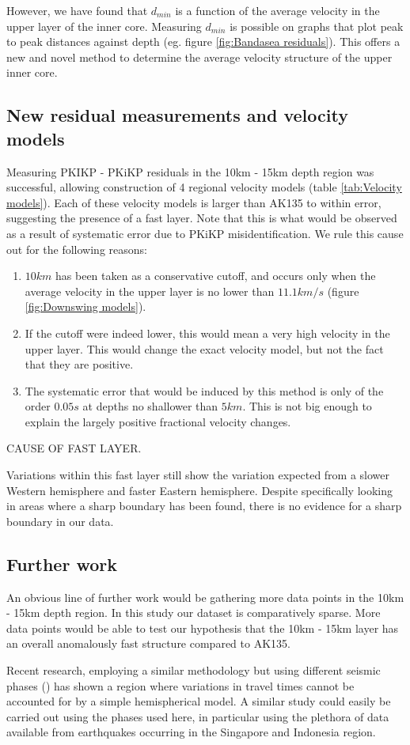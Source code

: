 \documentclass[11pt,a4paper]{article}
\begin{document}
However, we have found that $d_{min}$ is a function of the average velocity in the upper layer of the inner core. Measuring $d_{min}$ is possible on graphs that plot peak to peak distances against depth (eg. figure \ref{fig:Bandasea residuals}). This offers a new and novel method to determine the average velocity structure of the upper inner core.
\subsection{New residual measurements and velocity models}
Measuring PKIKP - PKiKP residuals in the 10km - 15km depth region was successful, allowing construction of 4 regional velocity models (table \ref{tab:Velocity models}). Each of these velocity models is larger than AK135 to within error, suggesting the presence of a fast layer. Note that this is what would be observed as a result of systematic error due to PKiKP misidentification. We rule this cause out for the following reasons:

\begin{enumerate}
	\item $10km$ has been taken as a conservative cutoff, and occurs only when the average velocity in the upper layer is no lower than $11.1 km/s$ (figure \ref{fig:Downswing models}).
	\item If the cutoff were indeed lower, this would mean a very high velocity in the upper layer. This would change the exact velocity model, but not the fact that they are positive.
	\item The systematic error that would be induced by this method is only of the order $0.05s$ at depths no shallower than $5km$. This is not big enough to explain the largely positive fractional velocity changes.
\end{enumerate}

CAUSE OF FAST LAYER.

Variations within this fast layer still show the variation expected from a slower Western hemisphere and faster Eastern hemisphere. Despite specifically looking in areas where a sharp boundary has been found, there is no evidence for a sharp boundary in our data.

\subsection{Further work}
An obvious line of further work would be gathering more data points in the 10km - 15km depth region. In this study our dataset is comparatively sparse. More data points would be able to test our hypothesis that the 10km - 15km layer has an overall anomalously fast structure compared to AK135.

Recent research, employing a similar methodology but using different seismic phases (\cite{Yee2014}) has shown a region where variations in travel times cannot be accounted for by a simple hemispherical model. A similar study could easily be carried out using the phases used here, in particular using the plethora of data available from earthquakes occurring in the Singapore and Indonesia region.


\end{document}
